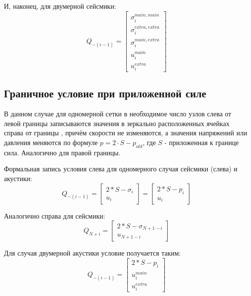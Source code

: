 \documentclass{article}
\begin{document}
\indent
И, наконец, для двумерной сейсмики:
$$Q_{-(i-1)} = \left[ \begin{array}{c}
                      \sigma^{main, main}_i \\
                      \sigma^{extra, extra}_i \\
                      \sigma^{main, extra}_i \\
                      u^{main}_i \\
                      u^{extra}_i
                      \end{array}    \right] $$
                  
                  
\subsection{Граничное условие при приложенной силе}

\indent
В данном случае для одномерной сетки в необходимое число узлов слева от левой границы записываются значения в зеркально расположенных ячейках справа от границы \cite[глава 22.4.2]{finite}, причём скорости не изменяются, а значения напряжений или давления меняются по формуле $p = 2 \cdot S - p_{old}$, где $S$ - приложенная к границе сила. Аналогично для правой границы.

\indent
Формальная запись условия слева для одномерного случая сейсмики (слева) и акустики:
$$Q_{-(i-1)} = \left[ \begin{array}{c}
                      2 * S - \sigma_i \\
                      u_i
                      \end{array}    \right] =
               \left[ \begin{array}{c}
                      2 * S - p_i \\
                      u_i
                      \end{array}    \right] $$

\indent
Аналогично справа для сейсмики:
$$Q_{N+i} = \left[ \begin{array}{c}
                   2 * S - \sigma_{N+1-i} \\
                   u_{N+1-i}
                   \end{array}    \right] $$   

\indent
Для случая двумерной акустики условие получается таким:
$$Q_{-(i-1)} = \left[ \begin{array}{c}
                      2 * S - p_i \\
                      u^{main}_i \\
                      u^{extra}_i 
                      \end{array}    \right] $$
\end{document}
